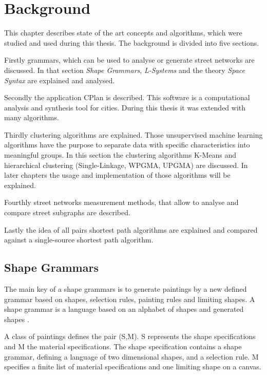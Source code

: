 \chapter{Background}
This chapter describes state of the art concepts and algorithms, which were studied and used during this thesis. The background is divided into five sections.

Firstly grammars, which can be used to analyse or generate street networks are discussed. In that section \textit{Shape Grammars}, \textit{L-Systems} and the theory \textit{Space Syntax} are explained and analysed.

Secondly the application CPlan is described. This software is a computational analysis and synthesis tool for cities. During this thesis it was extended with many algorithms.

Thirdly clustering algorithms are explained. Those unsupervised machine learning algorithms have the purpose to separate data with specific characteristics into meaningful groups. In this section the clustering algorithms K-Means and hierarchical clustering (Single-Linkage, WPGMA, UPGMA) are discussed. In later chapters the usage and implementation of those algorithms will be explained.

Fourthly street networks measurement methods, that allow to analyse and compare street subgraphs are described.

Lastly the idea of all pairs shortest path algorithms are explained and compared against a single-source shortest path algorithm.

\section{Shape Grammars} \label{sec:shape_grammar}
The main key of a shape grammars is to generate paintings by a new defined grammar based on shapes, selection rules, painting rules and limiting shapes. A shape grammar is a language based on an alphabet of shapes and generated shapes \citep{shapeGrammars:1972}.

A class of paintings defines the pair (S,M). S represents the shape specifications and M the material specifications. The shape specification contains a shape grammar, defining a language of two dimensional shapes, and a selection rule. M specifies a finite list of material specifications and one limiting shape on a canvas.

